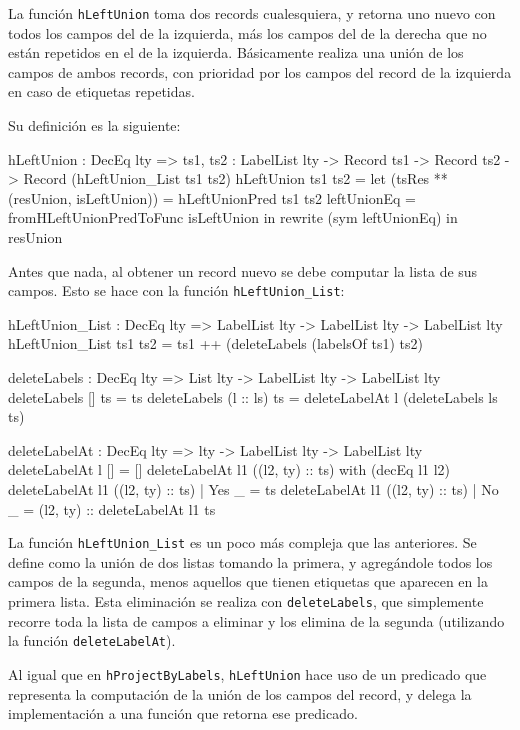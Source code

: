 La función \texttt{hLeftUnion} toma dos records cualesquiera, y retorna uno nuevo con todos los campos del de la izquierda, más los campos del de la derecha que no están repetidos en el de la izquierda. Básicamente realiza una unión de los campos de ambos records, con prioridad por los campos del record de la izquierda en caso de etiquetas repetidas.

Su definición es la siguiente:

\begin{code}
hLeftUnion : DecEq lty => {ts1, ts2 : LabelList lty} ->
  Record ts1 -> Record ts2 -> Record (hLeftUnion_List ts1 ts2)
hLeftUnion ts1 ts2 =
  let (tsRes ** (resUnion, isLeftUnion)) =
      hLeftUnionPred ts1 ts2
    leftUnionEq = fromHLeftUnionPredToFunc isLeftUnion
  in rewrite (sym leftUnionEq) in resUnion
\end{code}

Antes que nada, al obtener un record nuevo se debe computar la lista de sus campos. Esto se hace con la función \texttt{hLeftUnion\_List}:

\begin{code}
hLeftUnion_List : DecEq lty => LabelList lty ->
  LabelList lty -> LabelList lty
hLeftUnion_List ts1 ts2 =
  ts1 ++ (deleteLabels (labelsOf ts1) ts2)

deleteLabels : DecEq lty => List lty -> LabelList lty ->
  LabelList lty
deleteLabels [] ts = ts
deleteLabels (l :: ls) ts =
  deleteLabelAt l (deleteLabels ls ts)

deleteLabelAt : DecEq lty => lty -> LabelList lty ->
  LabelList lty
deleteLabelAt l [] = []
deleteLabelAt l1 ((l2, ty) :: ts) with (decEq l1 l2)
  deleteLabelAt l1 ((l2, ty) :: ts) | Yes _ = ts
  deleteLabelAt l1 ((l2, ty) :: ts) | No _ =
    (l2, ty) :: deleteLabelAt l1 ts
\end{code}

La función \texttt{hLeftUnion\_List} es un poco más compleja que las anteriores. Se define como la unión de dos listas tomando la primera, y agregándole todos los campos de la segunda, menos aquellos que tienen etiquetas que aparecen en la primera lista. Esta eliminación se realiza con \texttt{deleteLabels}, que simplemente recorre toda la lista de campos a eliminar y los elimina de la segunda (utilizando la función \texttt{deleteLabelAt}).

Al igual que en \texttt{hProjectByLabels}, \texttt{hLeftUnion} hace uso de un predicado que representa la computación de la unión de los campos del record, y delega la implementación a una función que retorna ese predicado.


